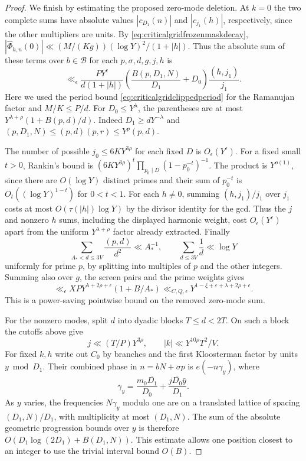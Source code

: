 \documentclass[11pt,a4paper]{article}
\numberwithin{equation}{section}
\begin{document}
\begin{proof}
We finish by estimating the proposed zero-mode deletion.
At $k=0$ the two complete sums have absolute values
$|c_{D_1}(n)|$ and $|c_{j_1}(h)|$, respectively, since
the other multipliers are units. By
\cref{eq:criticalgridfrozenmaskdecay},
$|\widehat\Phi_{h,n}(0)|\ll (M/(K g))(\log Y)^2/(1+|h|)$.
Thus the absolute sum of these terms over $b\in\mathcal B$
for each $p,\sigma,d,g,j,h$ is
\[
 \ll_\epsilon
   \frac{P Y^\epsilon}{d(1+|h|)}
   \left(\frac{B(p,D_1,N)}{D_1}+D_0\right)
     \frac{(h,j_1)}{j_1}.
\]
Here we used the period bound
\cref{eq:criticalgridclippedperiod} for the Ramanujan
factor and $M/K\le P/d$.
For $D_0\le Y^\lambda$, the parentheses are at most
$Y^{\lambda+\rho}(1+B(p,d)/d)$.
Indeed $D_1\ge dY^{-\lambda}$ and
$(p,D_1,N)\le(p,d)(p,r)\le Y^\rho(p,d)$.

The number of possible $j_0\le 6 K Y^{3\rho}$ for each
fixed $D$ is $O_\epsilon(Y^\epsilon)$.
For a fixed small $t>0$, Rankin's bound is
$(6 K Y^{3\rho})^t\prod_{p_0\mid D}(1-p_0^{-t})^{-1}$.
The product is $Y^{o(1)}$, since there are $O(\log Y)$
distinct primes and their sum of $p_0^{-t}$ is
$O_t((\log Y)^{1-t})$ for $0<t<1$.
For each $h\ne0$, summing $(h,j_1)/j_1$ over $j_1$
costs at most $O(\tau(|h|)\log Y)$ by the divisor
identity for the gcd. Thus the $j$ and nonzero $h$
sums, including the displayed harmonic weight, cost
$O_\epsilon(Y^\epsilon)$ apart from the uniform
$Y^{\lambda+\rho}$ factor already extracted.
Finally
\[
 \sum_{A_*<d\le3V}\frac{(p,d)}{d^2}\ll A_*^{-1},
 \qquad \sum_{d\le3V}\frac1d\ll\log Y
\]
uniformly for prime $p$, by splitting into multiples of $p$
and the other integers. Summing also over $g$, the screen
pairs and the prime weights gives
\[
 \ll_\epsilon XP Y^{\lambda+2\rho+\epsilon}
                       (1+B/A_*)
 \ll_{C,Q,\epsilon}Y^{1-\xi+\varepsilon+\lambda+2\rho+\epsilon}.
\]
This is a power-saving pointwise bound on the removed
zero-mode sum.

For the nonzero modes, split $d$ into dyadic blocks
$T\le d<2T$. On such a block the cutoffs above give
\[
 j\ll (T/P)Y^{3\rho},\qquad |k|\ll Y^{10\rho}T^2/V .
\]
For fixed $k,h$ write out $C_0$ by branches and the
first Kloosterman factor by units $y\bmod D_1$.
Their combined phase in $n=bN+\sigma p$ is
$e(-n\gamma_y)$, where
\[
 \gamma_y=\frac{m_0\overline{D_1}}{D_0}
                   +\frac{j\overline{D_0}\bar y}{D_1}.
\]
As $y$ varies, the frequencies $N\gamma_y$ modulo one
are on a translated lattice of spacing $(D_1,N)/D_1$,
with multiplicity at most $(D_1,N)$.
The sum of the absolute geometric progression bounds
over $y$ is therefore $O(D_1\log(2D_1)+B(D_1,N))$.
This estimate allows one position closest to an integer
to use the trivial interval bound $O(B)$.


\end{proof}
\end{document}

